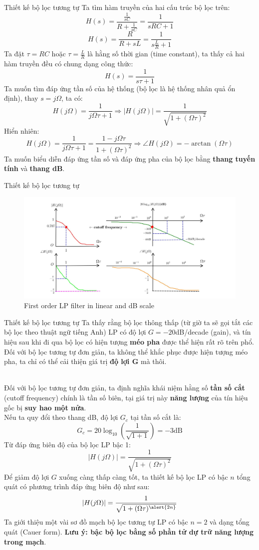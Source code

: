 \documentclass[8pt]{beamer}
\begin{document}
\begin{frame}{Thiết kế bộ lọc tương tự}
Ta tìm hàm truyền của hai cấu trúc bộ lọc trên:
$$H(s)=\frac{\frac{1}{sC}}{R+\frac{1}{sC}}=\frac{1}{sRC+1}$$
$$H(s)=\frac{R}{R+sL}=\frac{1}{s\frac{L}{R}+1}$$
Ta đặt $\tau=RC$ hoặc $\tau=\frac{L}{R}$ là hằng số thời gian (time constant), ta thấy cả hai hàm truyền đều có chung dạng công thức: $$H(s)=\frac{1}{s\tau+1}$$
Ta muốn tìm đáp ứng tần số của hệ thống (bộ lọc là hệ thống nhân quả ổn định), thay $s=j\Omega$, ta có:
$$H(j\Omega)=\frac{1}{j\Omega\tau+1}\Rightarrow |H(j\Omega)|=\frac{1}{\sqrt{1+(\Omega\tau)^2}}$$
Hiển nhiên: $$H(j\Omega)=\frac{1}{j\Omega\tau+1}=\frac{1-j\Omega\tau}{1+(\Omega\tau)^2}\Rightarrow \angle H(j\Omega)=-\arctan{(\Omega\tau)}$$
Ta muốn biểu diễn đáp ứng tần số và đáp ứng pha của bộ lọc bằng \textbf{thang tuyến tính} và \textbf{thang dB}.
\end{frame}
\begin{frame}{Thiết kế bộ lọc tương tự}
\begin{figure}[h]
			\includegraphics[width=1.1\textwidth]{3.jpg}
			\caption{First order LP filter in linear and dB scale}			\label{fig:re2}
		\end{figure}

\end{frame}
\begin{frame}{Thiết kế bộ lọc tương tự}
	Ta thấy rằng bộ lọc thông thấp (từ giờ ta sẽ gọi tắt các bộ lọc theo thuật ngữ tiếng Anh) LP có độ lợi $G=-20$dB/decade (gain), và tín hiệu sau khi đi qua bộ lọc có hiện tượng \textbf{méo pha} được thể hiện rất rõ trên phổ. Đối với bộ lọc tương tự đơn giản, ta \alert{không thể khắc phục được hiện tượng méo pha}, ta chỉ có thể cải thiện giá trị \textbf{độ lợi G} mà thôi.

	\\Đối với bộ lọc tương tự đơn giản, ta định nghĩa khái niệm hằng số \textbf{tần số cắt} (cutoff frequency) chính là \alert{tần số biên}, tại giá trị này \textbf{năng lượng} của tín hiệu gốc bị \textbf{suy hao một nửa}. 
	\\ Nếu ta quy đổi theo thang dB, độ lợi $G_{c}$ tại tần số cắt là:
	$$G_{c}=20\log_{10}\left(\frac{1}{\sqrt{1+1}}\right)=-3\text{dB}$$
	Từ đáp ứng biên độ của bộ lọc LP bậc 1: $$|H(j\Omega)|=\frac{1}{\sqrt{1+(\Omega\tau)^2}}$$
	 Để giảm độ lợi $G$ xuống càng thấp càng tốt, ta thiết kế bộ lọc LP có bậc $n$ tổng quát có phương trình đáp ứng biên độ như sau:
	 $$|H(j\Omega)|=\frac{1}{\sqrt{1+(\Omega\tau)^{\alert{2n}}}}$$
	 Ta giới thiệu một vài sơ đồ mạch bộ lọc tương tự LP có bậc $n=2$ và dạng tổng quát (Cauer form). \textbf{Lưu ý: bậc bộ lọc bằng số phần tử dự trữ năng lượng trong mạch}.
\end{frame}
\end{document}

